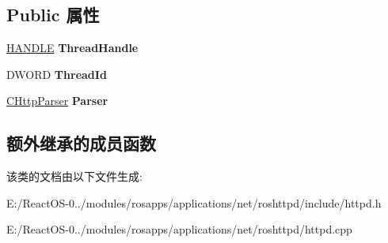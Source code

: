 \subsection*{Public 属性}
\begin{DoxyCompactItemize}
\item 
\mbox{\label{class_c_http_client_ac2f34fadec1dd5014d552b9eb1b36da1}} 
\hyperlink{interfacevoid}{H\+A\+N\+D\+LE} {\bfseries Thread\+Handle}
\item 
\mbox{\label{class_c_http_client_a97a586ed3be2f2b5e9f2c8a9e364bed5}} 
D\+W\+O\+RD {\bfseries Thread\+Id}
\item 
\mbox{\label{class_c_http_client_ad4df721fda27ba7ff273dd8133338ead}} 
\hyperlink{class_c_http_parser}{C\+Http\+Parser} {\bfseries Parser}
\end{DoxyCompactItemize}
\subsection*{额外继承的成员函数}


该类的文档由以下文件生成\+:\begin{DoxyCompactItemize}
\item 
E\+:/\+React\+O\+S-\/0../modules/rosapps/applications/net/roshttpd/include/httpd.\+h\item 
E\+:/\+React\+O\+S-\/0../modules/rosapps/applications/net/roshttpd/httpd.\+cpp\end{DoxyCompactItemize}
